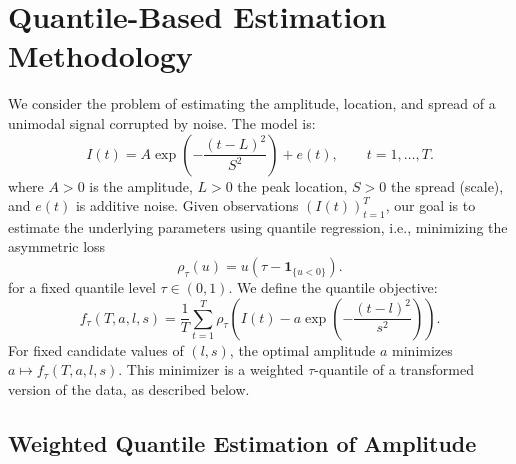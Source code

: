 \documentclass[12pt,a4paper]{article}
\begin{document}
\section{Quantile-Based Estimation Methodology}
\label{section:quantile_amplitude}

We consider the problem of estimating the amplitude, location, and spread of a unimodal signal corrupted by noise. The model is:
\begin{equation}
	I(t)
	=
	A\exp\left(-\frac{(t-L)^2}{S^2}\right)+e(t),
	\qquad t=1,\ldots,T.
	\label{eq:signal_model}
\end{equation}
where \( A > 0 \) is the amplitude, \( L > 0 \) the peak location, \( S > 0 \) the spread (scale), and \( e(t) \) is additive noise. Given observations \( (I(t))_{t=1}^T \), our goal is to estimate the underlying parameters using quantile regression, i.e., minimizing the asymmetric loss
\begin{equation}
	\rho_\tau(u)
	=
	u\left(\tau-\mathbf{1}_{\{u<0\}}\right).
	\label{eq:check_function}
\end{equation}
for a fixed quantile level \( \tau \in (0,1) \).
We define the quantile objective:
\begin{equation}
	f_\tau(T,a,l,s)
	=
	\frac{1}{T}
	\sum_{t=1}^T
	\rho_\tau
	\left(
	I(t)-a\exp\left(-\frac{(t-l)^2}{s^2}\right)
	\right).
	\label{eq:quantile_objective}
\end{equation}
For fixed candidate values of \( (l,s) \), the optimal amplitude \( a \) minimizes \( a \mapsto f_\tau(T,a,l,s) \). This minimizer is a weighted \(\tau\)-quantile of a transformed version of the data, as described below.

\subsection{Weighted Quantile Estimation of Amplitude}
\label{sec:weighted_median_method}
\end{document}
